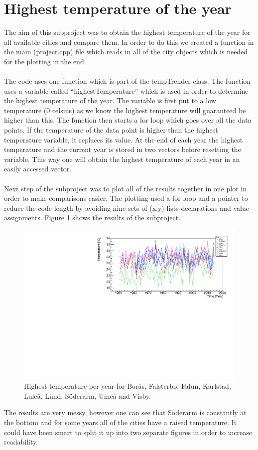 \documentclass[../main.tex]{subfiles}
\begin{document}
\section{Highest temperature of the year}
	The aim of this subproject was to obtain the highest temperature of the year for all available cities and compare them. In order to do this we created a function in the 
	main (project.cpp) file which reads in all of the city objects which is needed for the plotting in the end.
	\\\\
	The code uses one function which is part of the tempTrender class. The function uses a variable called ``highestTemperature'' which is used in order to determine 
	the highest temperature of the year. The variable is first put to a low temperature (0 celsius) as we know the highest temperature will guaranteed be higher than this. 
	The function then starts a for loop which goes over all the data points. If the temperature of the data point is higher than the highest temperature variable, it 
	replaces its value. At the end of each year the highest temperature and the current year is stored in two vectors before resetting the variable. This way one will obtain 
	the highest temperature of each year in an easily accessed vector.
	\\\\
	Next step of the subproject was to plot all of the results together in one plot in order to make comparisons easier. The plotting used a for loop and a pointer to reduce 
	the code length by avoiding nine sets of (x,y) lists declarations and value assignments. Figure \ref{highestTemperature} shows the results of the subproject.
	\begin{figure}[H]
	  \centering
	  \includegraphics[width = \textwidth]{hottestdaysallcities}
	  \caption{Highest temperature per year for Borås, Falsterbo, Falun, Karlstad, Luleå, Lund, Söderarm, Umeå and Visby.}
	  \label{highestTemperature}
	\end{figure}\noindent
	The results are very messy, however one can see that Söderarm is constantly at the bottom and for some years all of the cities have a raised temperature. It could have 
	been smart to split it up into two separate figures in order to increase readability.
\end{document}
